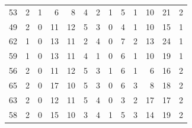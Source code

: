 \begin{table}[]
\begin{tabular}{rrrrrrrrrrrrr}
		53 & 2 & 1 & 6 & 8 & 4 & 2 & 1 & 5 & 1 & 10 & 21 & 2 \\
		49 & 2 & 0 & 11 & 12 & 5 & 3 & 0 & 4 & 1 & 10 & 15 & 1 \\
		62 & 1 & 0 & 13 & 11 & 2 & 4 & 0 & 7 & 2 & 13 & 24 & 1 \\
		59 & 1 & 0 & 13 & 11 & 4 & 1 & 0 & 6 & 1 & 10 & 19 & 1 \\
		56 & 2 & 0 & 11 & 12 & 5 & 3 & 1 & 6 & 1 & 6 & 16 & 2 \\
		65 & 2 & 0 & 17 & 10 & 5 & 3 & 0 & 6 & 3 & 8 & 18 & 2 \\
		63 & 2 & 0 & 12 & 11 & 5 & 4 & 0 & 3 & 2 & 17 & 17 & 2 \\
		58 & 2 & 0 & 15 & 10 & 3 & 4 & 1 & 5 & 3 & 14 & 19 & 2
	\end{tabular}
\end{table}

